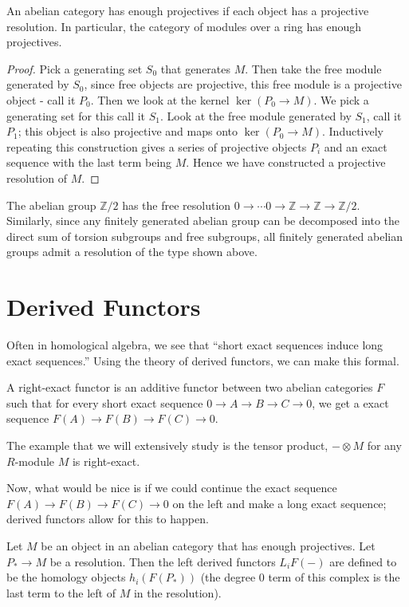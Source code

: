 \begin{theorem}An abelian category has enough projectives if each object has a
projective resolution. In particular, the category of modules over a ring has
enough projectives. \end{theorem}
\begin{proof} Pick a generating set $S_0$ that generates $M$. Then take the free
module generated by $S_0$, since free objects are projective, this free module
is a projective object - call it $P_0$. Then we look at the kernel
$\ker(P_0\rightarrow M)$. We pick a generating set for this call it $S_1$. Look
at the free module generated by $S_1$, call it $P_1$; this object is also
projective and maps onto $\ker(P_0\rightarrow M)$. Inductively repeating this
construction gives a series of projective objects $P_i$ and an exact sequence
with the last term being $M$. Hence we have constructed a projective resolution
of $M$. \end{proof}


\begin{example} The abelian group $\mathbb{Z}/2$ has the free resolution $0\rightarrow\cdots 0\rightarrow\mathbb{Z}\rightarrow\mathbb{Z}\rightarrow\mathbb{Z}/2$.
Similarly, since any finitely generated abelian group can be decomposed into the direct sum of torsion subgroups and free subgroups, all finitely generated abelian groups admit a resolution of the type shown above.\end{example}

\section{Derived Functors}
Often in homological algebra, we see that ``short exact sequences induce long exact sequences.'' Using the theory of derived functors, we can make this formal.

\begin{definition} A right-exact functor is an additive functor between two abelian categories $F$ such that for every short exact sequence $0\rightarrow A\rightarrow B\rightarrow C\rightarrow 0$, we get a exact sequence $F(A)\rightarrow F(B)\rightarrow F(C)\rightarrow 0$.
\end{definition}


\begin{example} The example that we will extensively study is the tensor product, $-\otimes M$ for any $R$-module $M$ is right-exact.\end{example}
Now, what would be nice is if we could continue the exact sequence $F(A)\rightarrow F(B)\rightarrow F(C)\rightarrow 0$ on the left and make a long exact sequence; derived functors allow for this to happen.

\begin{definition} Let $M$ be an object in an abelian category that has enough projectives. Let $P_*\rightarrow M$ be a resolution. Then the left derived functors $L_iF(-)$ are defined to be the homology objects $h_i(F(P_*))$ (the degree $0$ term of this complex is the last term to the left of $M$ in the resolution).\end{definition}

